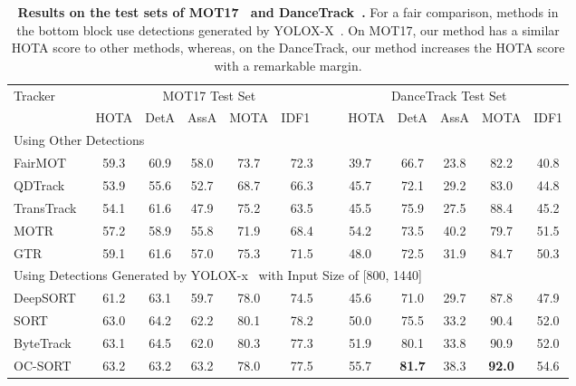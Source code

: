 \documentclass[journal]{IEEEtran}
\begin{document}
\begin{table*}[h!]
   \begin{minipage}[t]{.65\textwidth}
      \caption{\textbf{Results on the test sets of MOT17~\cite{MOT16} and DanceTrack~\cite{sun2022dancetrack}.} For a fair comparison, methods in the bottom block use detections generated by YOLOX-X~\cite{ge2021yolox}. On MOT17, our method has a similar HOTA score to other methods, whereas, on the DanceTrack, our method increases the HOTA score with a remarkable margin. }
      \centering
      \setlength{\tabcolsep}{0.8pt}
      \footnotesize
      \begin{tabular}{l c c c c c  c c c c c }
         \toprule
         \multirow{2}{*}{Tracker} & \multicolumn{5}{c}{MOT17 Test Set}  & \multicolumn{5}{c}{DanceTrack Test Set} \\
\cmidrule(lr){2-6}\cmidrule(lr){7-11}
         & HOTA & DetA & AssA & MOTA & IDF1~~ 
         & ~~HOTA & DetA & AssA & MOTA & IDF1\\
         \hline
         \hline
         \multicolumn{11}{l}{Using Other Detections }   \\
FairMOT~\cite{FairMOT} & 59.3 & 60.9 & 58.0 & 73.7 & 72.3 & 39.7 & 66.7 & 23.8 & 82.2 & 40.8 \\
         QDTrack~\cite{quasidense} & 53.9 & 55.6 & 52.7 & 68.7 & 66.3& 45.7 & 72.1 & 29.2 & 83.0 & 44.8\\
         TransTrack~\cite{Transtrack} &  54.1 & 61.6 & 47.9 & 75.2 & 63.5 & 45.5 & 75.9 & 27.5 & 88.4 & 45.2\\
         MOTR~\cite{MOTR} & 57.2 & 58.9 & 55.8 & 71.9 & 68.4 & 54.2 & 73.5 & 40.2	& 79.7 & 51.5 \\
         GTR~\cite{zhou2022global} & 59.1 & 61.6 & 57.0 & 75.3 & 71.5 & 48.0 & 72.5 & 31.9 & 84.7 &  50.3\\
\hline
         \multicolumn{11}{l}{Using Detections Generated by YOLOX-x~\cite{ge2021yolox} with Input Size of [800, 1440]}   \\
DeepSORT~\cite{DeepSORT} &61.2  &63.1 &59.7 &78.0  & 74.5 &45.6 &71.0 &29.7 &87.8 &47.9\\
         SORT~\cite{SORT} &63.0 & 64.2 & 62.2 & 80.1 & 78.2 &50.0 &75.5 & 33.2 & 90.4 & 52.0\\
         ByteTrack~\cite{bytetrack}& 63.1 & 64.5 & 62.0 & 80.3 & 77.3 &  51.9 & 80.1 & 33.8 & 90.9 & 52.0\\
         OC-SORT~\cite{cao2022observation} & 63.2 & 63.2 & 63.2 & 78.0 & 77.5 & 55.7 & \textbf{81.7} & 38.3 & \textbf{92.0} & 54.6\\

\end{tabular}
\end{minipage}
\end{table*}
\end{document}
